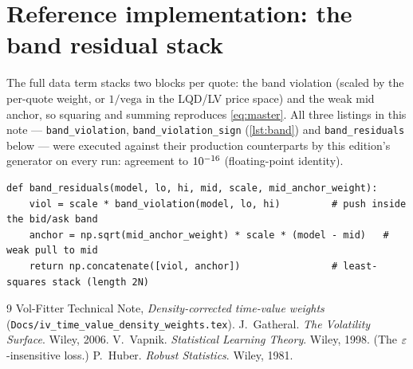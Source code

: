 \documentclass[11pt]{article}
\begin{document}
\section{Reference implementation: the band residual stack}
\label{app:ref}

The full data term stacks two blocks per quote: the band violation
(scaled by the per-quote weight, or $1/\text{vega}$ in the LQD/LV price
space) and the weak mid anchor, so squaring and summing reproduces
\eqref{eq:master}.  All three listings in this note ---
\texttt{band\_violation}, \texttt{band\_violation\_sign}
(\cref{lst:band}) and \texttt{band\_residuals} below --- were executed
against their production counterparts by this edition's generator on
every run: agreement to $10^{-16}$ (floating-point identity).

\begin{lstlisting}[caption={The stacked band-objective residual (distilled
from \texttt{calib/band.py}).}]
def band_residuals(model, lo, hi, mid, scale, mid_anchor_weight):
    viol = scale * band_violation(model, lo, hi)         # push inside the bid/ask band
    anchor = np.sqrt(mid_anchor_weight) * scale * (model - mid)   # weak pull to mid
    return np.concatenate([viol, anchor])                # least-squares stack (length 2N)
\end{lstlisting}

\begin{thebibliography}{9}
 Vol-Fitter Technical Note, \emph{Density-corrected
time-value weights}
(\texttt{Docs/iv\_time\_value\_density\_weights.tex}).
 J.~Gatheral.  \emph{The Volatility Surface}.
Wiley, 2006.
 V.~Vapnik.  \emph{Statistical Learning Theory}.
Wiley, 1998.  (The $\varepsilon$-insensitive loss.)
 P.~Huber.  \emph{Robust Statistics}.  Wiley, 1981.
\end{thebibliography}
\end{document}
